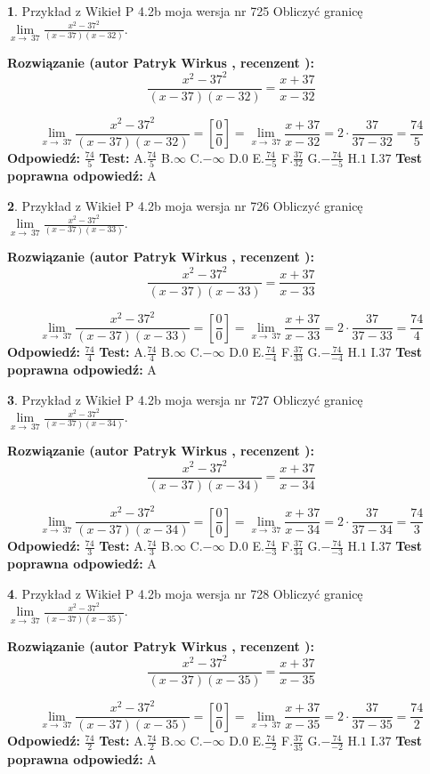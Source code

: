 \documentclass[12pt, a4paper]{article}
\theoremstyle{definition} %
\newtheorem{zad}{}
\newcommand{\zadStart}[1]{\begin{zad}#1\newline}
\newcommand{\zadStop}{\end{zad}}
\newcommand{\rozwStart}[2]{\noindent \textbf{Rozwiązanie (autor #1 , recenzent #2): }\newline}
\newcommand{\rozwStop}{\newline}
\newcommand{\odpStart}{\noindent \textbf{Odpowiedź:}\newline}
\newcommand{\odpStop}{\newline}
\newcommand{\testStart}{\noindent \textbf{Test:}\newline}
\newcommand{\testStop}{\newline}
\newcommand{\kluczStart}{\noindent \textbf{Test poprawna odpowiedź:}\newline}
\newcommand{\kluczStop}{\newline}
\begin{document}
\zadStart{Przykład z Wikieł P 4.2b moja wersja nr 725}
Obliczyć granicę $\lim\limits_{x\to\ 37}\frac{x^{2}-37^{2}}{(x-37)(x-32)}$.
\zadStop
\rozwStart{Patryk Wirkus}{}
$$\frac{x^{2}-37^{2}}{(x-37)(x-32)}=\frac{x+37}{x-32}$$

$$\lim\limits_{x\to\ 37}\frac{x^{2}-37^{2}}{(x-37)(x-32)}=[\frac{0}{0}]=\lim\limits_{x\to\ 37}\frac{x+37}{x-32}=2 \cdot \frac{37}{37-32} = \frac{74}{5}$$
\rozwStop
\odpStart
$\frac{74}{5}$
\odpStop
\testStart
A.$\frac{74}{5}$
B.$\infty$
C.$-\infty$
D.$0$
E.$\frac{74}{-5}$
F.$\frac{37}{32}$
G.$-\frac{74}{-5}$
H.$1$
I.$37$
\testStop
\kluczStart
A
\kluczStop



\zadStart{Przykład z Wikieł P 4.2b moja wersja nr 726}
Obliczyć granicę $\lim\limits_{x\to\ 37}\frac{x^{2}-37^{2}}{(x-37)(x-33)}$.
\zadStop
\rozwStart{Patryk Wirkus}{}
$$\frac{x^{2}-37^{2}}{(x-37)(x-33)}=\frac{x+37}{x-33}$$

$$\lim\limits_{x\to\ 37}\frac{x^{2}-37^{2}}{(x-37)(x-33)}=[\frac{0}{0}]=\lim\limits_{x\to\ 37}\frac{x+37}{x-33}=2 \cdot \frac{37}{37-33} = \frac{74}{4}$$
\rozwStop
\odpStart
$\frac{74}{4}$
\odpStop
\testStart
A.$\frac{74}{4}$
B.$\infty$
C.$-\infty$
D.$0$
E.$\frac{74}{-4}$
F.$\frac{37}{33}$
G.$-\frac{74}{-4}$
H.$1$
I.$37$
\testStop
\kluczStart
A
\kluczStop



\zadStart{Przykład z Wikieł P 4.2b moja wersja nr 727}
Obliczyć granicę $\lim\limits_{x\to\ 37}\frac{x^{2}-37^{2}}{(x-37)(x-34)}$.
\zadStop
\rozwStart{Patryk Wirkus}{}
$$\frac{x^{2}-37^{2}}{(x-37)(x-34)}=\frac{x+37}{x-34}$$

$$\lim\limits_{x\to\ 37}\frac{x^{2}-37^{2}}{(x-37)(x-34)}=[\frac{0}{0}]=\lim\limits_{x\to\ 37}\frac{x+37}{x-34}=2 \cdot \frac{37}{37-34} = \frac{74}{3}$$
\rozwStop
\odpStart
$\frac{74}{3}$
\odpStop
\testStart
A.$\frac{74}{3}$
B.$\infty$
C.$-\infty$
D.$0$
E.$\frac{74}{-3}$
F.$\frac{37}{34}$
G.$-\frac{74}{-3}$
H.$1$
I.$37$
\testStop
\kluczStart
A
\kluczStop



\zadStart{Przykład z Wikieł P 4.2b moja wersja nr 728}
Obliczyć granicę $\lim\limits_{x\to\ 37}\frac{x^{2}-37^{2}}{(x-37)(x-35)}$.
\zadStop
\rozwStart{Patryk Wirkus}{}
$$\frac{x^{2}-37^{2}}{(x-37)(x-35)}=\frac{x+37}{x-35}$$

$$\lim\limits_{x\to\ 37}\frac{x^{2}-37^{2}}{(x-37)(x-35)}=[\frac{0}{0}]=\lim\limits_{x\to\ 37}\frac{x+37}{x-35}=2 \cdot \frac{37}{37-35} = \frac{74}{2}$$
\rozwStop
\odpStart
$\frac{74}{2}$
\odpStop
\testStart
A.$\frac{74}{2}$
B.$\infty$
C.$-\infty$
D.$0$
E.$\frac{74}{-2}$
F.$\frac{37}{35}$
G.$-\frac{74}{-2}$
H.$1$
I.$37$
\testStop
\kluczStart
A
\kluczStop
\end{document}
